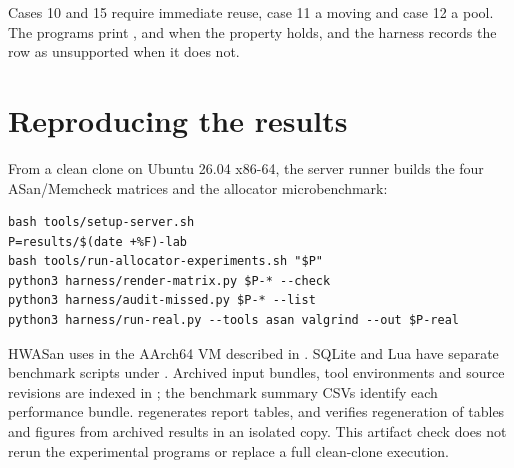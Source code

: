 Cases 10 and 15 require immediate reuse, case 11 a moving  and case 12 a pool. The programs print ,  and  when the property holds, and the harness records the row as unsupported when it does not.

\section{Reproducing the results}
\label{app:repro}

From a clean clone on Ubuntu 26.04 x86-64, the server runner builds the four ASan/Memcheck matrices and the allocator microbenchmark: {\small
\begin{verbatim}
bash tools/setup-server.sh
P=results/$(date +%F)-lab
bash tools/run-allocator-experiments.sh "$P"
python3 harness/render-matrix.py $P-* --check
python3 harness/audit-missed.py $P-* --list
python3 harness/run-real.py --tools asan valgrind --out $P-real
\end{verbatim}}
HWASan uses  in the AArch64 VM described in . SQLite and Lua have separate benchmark scripts under . Archived input bundles, tool environments and source revisions are indexed in ; the benchmark summary CSVs identify each performance bundle.  regenerates report tables, and  verifies regeneration of tables and figures from archived results in an isolated copy. This artifact check does not rerun the experimental programs or replace a full clean-clone execution.
